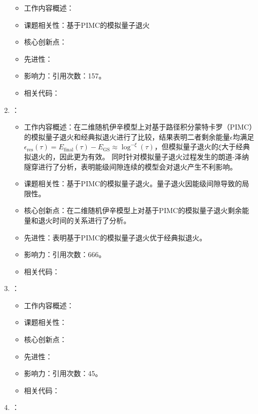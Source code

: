 \begin{enumerate}
\begin{itemize}
                \item 工作内容概述：
                \item 课题相关性：基于PIMC的模拟量子退火
                \item 核心创新点：
                \item 先进性：
                \item 影响力：引用次数：157。
                \item 相关代码：
            \end{itemize}
        \item \citet{santoro2002theory}：
            \begin{itemize}
                \item 工作内容概述：在二维随机伊辛模型上对基于路径积分蒙特卡罗（PIMC）的模拟量子退火和经典拟退火进行了比较，结果表明二者剩余能量$\epsilon$均满足$\epsilon_{\text{res}}(\tau)=E_{\text{final}}(\tau)-E_{\text{GS}}\approx\log^{-\xi}(\tau)$，但模拟量子退火的$\xi$大于经典拟退火的，因此更为有效。
                同时针对模拟量子退火过程发生的朗道-泽纳隧穿进行了分析，表明能级间隙连续的模型会对退火产生不利影响。
                \item 课题相关性：基于PIMC的模拟量子退火。量子退火因能级间隙导致的局限性。
                \item 核心创新点：在二维随机伊辛模型上对基于PIMC的模拟量子退火剩余能量和退火时间的关系进行了分析。
                \item 先进性：表明基于PIMC的模拟量子退火优于经典拟退火。
                \item 影响力：引用次数：666。
                \item 相关代码：
            \end{itemize}
            \item \citet{liu2003quantum}：
            \begin{itemize}
                \item 工作内容概述：
                \item 课题相关性：
                \item 核心创新点：
                \item 先进性：
                \item 影响力：引用次数：45。
                \item 相关代码：
            \end{itemize}
            \item \citet{martovnak2004quantum}：
            \begin{itemize}

\end{itemize}
\end{enumerate}
